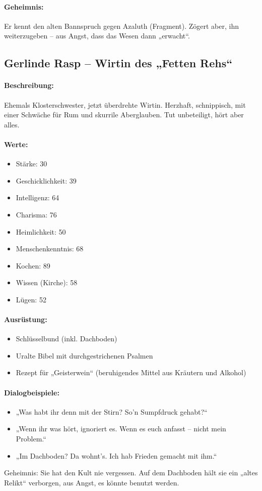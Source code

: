 \paragraph{Geheimnis:}
Er kennt den alten Bannspruch gegen Azaluth (Fragment). Zögert aber, ihn weiterzugeben – aus Angst, dass das Wesen dann „erwacht“.
\newpage
\subsection{Gerlinde Rasp – Wirtin des „Fetten Rehs“}
\paragraph{Beschreibung:}
Ehemals Klosterschwester, jetzt überdrehte Wirtin. Herzhaft, schnippisch, mit einer Schwäche für Rum und skurrile Aberglauben. Tut unbeteiligt, hört aber alles.
\paragraph{Werte:}
\begin{itemize}
\item Stärke: 30
\item Geschicklichkeit: 39
\item Intelligenz: 64
\item Charisma: 76
\item Heimlichkeit: 50
\item Menschenkenntnis: 68
\item Kochen: 89
\item Wissen (Kirche): 58
\item Lügen: 52
\end{itemize}
\paragraph{Ausrüstung:}
\begin{itemize}
\item Schlüsselbund (inkl. Dachboden)
\item Uralte Bibel mit durchgestrichenen Psalmen
\item Rezept für „Geisterwein“ (beruhigendes Mittel aus Kräutern und Alkohol)
\end{itemize}
\paragraph{Dialogbeispiele:}
\begin{itemize}
\item „Was habt ihr denn mit der Stirn? So’n Sumpfdruck gehabt?“
\item „Wenn ihr was hört, ignoriert es. Wenn es euch anfasst – nicht mein Problem.“
\item „Im Dachboden? Da wohnt’s. Ich hab Frieden gemacht mit ihm.“
\end{itemize}
Geheimnis:
Sie hat den Kult nie vergessen. Auf dem Dachboden hält sie ein „altes Relikt“ verborgen, aus Angst, es könnte benutzt werden.
\newpage
